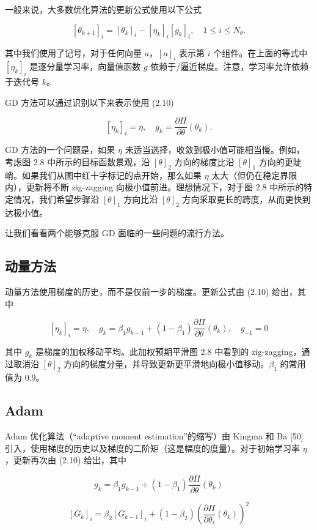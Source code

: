 一般来说，大多数优化算法的更新公式使用以下公式

\[
[\theta_{k+1}]_i = [\theta_k]_i - [\eta_k]_i [g_k]_i, \quad 1 \leq i \leq N_\theta.
\]

其中我们使用了记号，对于任何向量 $a$，$[a]_i$ 表示第 $i$ 个组件。在上面的等式中 $[\eta_k]_i$ 是逐分量学习率，向量值函数 $g$ 依赖于/逼近梯度。注意，学习率允许依赖于迭代号 $k$。

GD 方法可以通过识别以下来表示使用 (2.10)

\[
[\eta_k]_i = \eta, \quad g_k = \frac{\partial \Pi}{\partial \theta}(\theta_k).
\]

GD 方法的一个问题是，如果 $\eta$ 未适当选择，收敛到极小值可能相当慢。例如，考虑图 2.8 中所示的目标函数景观，沿 $[\theta]_2$ 方向的梯度比沿 $[\theta]_1$ 方向的更陡峭。如果我们从图中红十字标记的点开始，那么如果 $\eta$ 太大（但仍在稳定界限内），更新将不断 zig-zagging 向极小值前进。理想情况下，对于图 2.8 中所示的特定情况，我们希望步骤沿 $[\theta]_1$ 方向比沿 $[\theta]_2$ 方向采取更长的跨度，从而更快到达极小值。

让我们看看两个能够克服 GD 面临的一些问题的流行方法。

\subsection{动量方法}

动量方法使用梯度的历史，而不是仅前一步的梯度。更新公式由 (2.10) 给出，其中

\[
[\eta_k]_i = \eta, \quad g_k = \beta_1 g_{k-1} + (1 - \beta_1) \frac{\partial \Pi}{\partial \theta}(\theta_k), \quad g_{-1} = 0
\]

其中 $g_k$ 是梯度的加权移动平均。此加权预期平滑图 2.8 中看到的 zig-zagging，通过取消沿 $[\theta]_2$ 方向的梯度分量，并导致更新更平滑地向极小值移动。$\beta_1$ 的常用值为 0.9。

\subsection{Adam}

Adam 优化算法（“adaptive moment estimation”的缩写）由 Kingma 和 Ba [50] 引入，使用梯度的历史以及梯度的二阶矩（这是幅度的度量）。对于初始学习率 $\eta$，更新再次由 (2.10) 给出，其中

\[
g_k = \beta_1 g_{k-1} + (1 - \beta_1) \frac{\partial \Pi}{\partial \theta}(\theta_k)
\]

\[
[G_k]_i = \beta_2 [G_{k-1}]_i + (1 - \beta_2) \left( \frac{\partial \Pi}{\partial \theta_i}(\theta_k) \right)^2
\]

